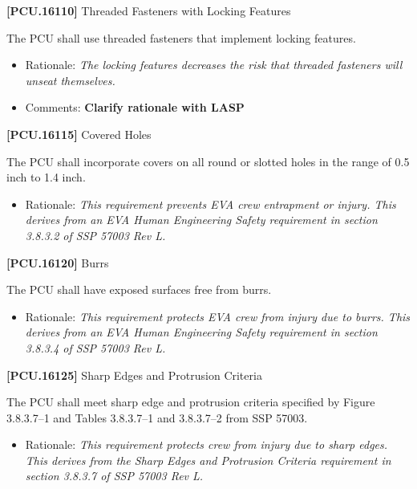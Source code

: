 \documentclass[12pt,oneside,oldfontcommands]{memoir}
\begin{document}
\textbf{[PCU.16110]} Threaded Fasteners with Locking Features

The \gls{PCU} shall use threaded fasteners that implement locking features.

\begin{itemize}
\item{} Rationale: \emph{The locking features decreases the risk that threaded fasteners will unseat themselves.}

\item{} Comments: \textbf{Clarify rationale with LASP}

\end{itemize}

\textbf{[PCU.16115]} Covered Holes

The \gls{PCU} shall incorporate covers on all round or slotted holes in the range of 0.5 inch to 1.4 inch.

\begin{itemize}
\item{} Rationale: \emph{This requirement prevents EVA crew entrapment or injury. This derives from an EVA Human Engineering Safety requirement in section 3.8.3.2 of SSP 57003 Rev L.}

\end{itemize}

\textbf{[PCU.16120]} Burrs

The \gls{PCU} shall have exposed surfaces free from burrs.

\begin{itemize}
\item{} Rationale: \emph{This requirement protects EVA crew from injury due to burrs. This derives from an EVA Human Engineering Safety requirement in section 3.8.3.4 of SSP 57003 Rev L.}

\end{itemize}

\textbf{[PCU.16125]} Sharp Edges and Protrusion Criteria

The \gls{PCU} shall meet sharp edge and protrusion criteria specified by Figure 3.8.3.7--1 and Tables 3.8.3.7--1 and 3.8.3.7--2 from SSP 57003.

\begin{itemize}
\item{} Rationale: \emph{This requirement protects crew from injury due to sharp edges. This derives from the Sharp Edges and Protrusion Criteria requirement in section 3.8.3.7 of SSP 57003 Rev L.}

\end{itemize}
\end{document}
